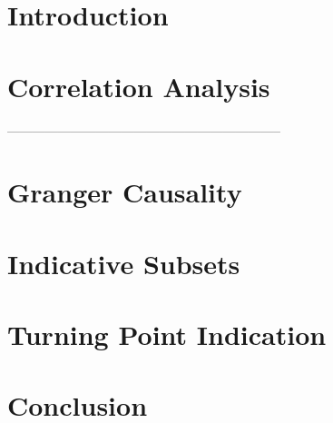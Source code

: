 \documentclass[12pt]{article}
\theoremstyle{plain}
\theoremstyle{definition}
\begin{document}
\section{Introduction}
\label{ch:intro}

\newpage

\section{Correlation Analysis}
\label{ch:corr}

\newpage
-----------------------------------------------------------------
\section{Granger Causality}
\label{ch:granger causallity}

\newpage

\section{Indicative Subsets}
\label{ch:ind_subsets}

\newpage


\section{Turning Point Indication}
\label{ch:turning_point}

\newpage

\section{Conclusion}
\label{ch:conclusion}

\newpage
\end{document}
